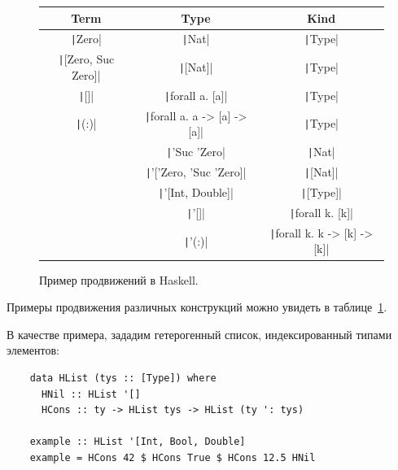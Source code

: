 \begin{figure}[h]
    \centering
    \begin{tabular}{|c|c|c|}
        \hline
        Term                                   & Type                                            & Kind                                            \\
        \hline
        \texttt|Zero|             & \texttt|Nat|                       & \texttt|Type|                      \\
        \texttt|[Zero, Suc Zero]| & \texttt|[Nat]|                     & \texttt|Type|                      \\
        \texttt|[]|               & \texttt|forall a. [a]|             & \texttt|Type|                      \\
        \texttt|(:)|              & \texttt|forall a. a -> [a] -> [a]| & \texttt|Type|                      \\
        & \texttt|'Suc 'Zero|                & \texttt|Nat|                       \\
        & \texttt|'['Zero, 'Suc 'Zero]|      & \texttt|[Nat]|                     \\
        & \texttt|'[Int, Double]|            & \texttt|[Type]|                    \\
        & \texttt|'[]|                       & \texttt|forall k. [k]|             \\
        & \texttt|'(:)|                      & \texttt|forall k. k -> [k] -> [k]| \\
        \hline
    \end{tabular}
    \caption{Пример продвижений в Haskell.}
    \label{fig:universes}
\end{figure}

Примеры продвижения различных конструкций можно увидеть в таблице~\ref{fig:universes}.

В качестве примера, зададим гетерогенный список, индексированный типами элементов:
\begin{verbatim}
    data HList (tys :: [Type]) where
      HNil :: HList '[]
      HCons :: ty -> HList tys -> HList (ty ': tys)

    example :: HList '[Int, Bool, Double]
    example = HCons 42 $ HCons True $ HCons 12.5 HNil
\end{verbatim}

